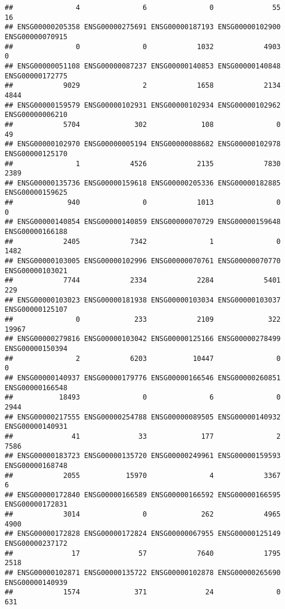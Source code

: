 \documentclass[
]{article}
\begin{document}
\begin{verbatim}
##               4               6               0              55              16 
## ENSG00000205358 ENSG00000275691 ENSG00000187193 ENSG00000102900 ENSG00000070915 
##               0               0            1032            4903               0 
## ENSG00000051108 ENSG00000087237 ENSG00000140853 ENSG00000140848 ENSG00000172775 
##            9029               2            1658            2134            4844 
## ENSG00000159579 ENSG00000102931 ENSG00000102934 ENSG00000102962 ENSG00000006210 
##            5704             302             108               0              49 
## ENSG00000102970 ENSG00000005194 ENSG00000088682 ENSG00000102978 ENSG00000125170 
##               1            4526            2135            7830            2389 
## ENSG00000135736 ENSG00000159618 ENSG00000205336 ENSG00000182885 ENSG00000159625 
##             940               0            1013               0               0 
## ENSG00000140854 ENSG00000140859 ENSG00000070729 ENSG00000159648 ENSG00000166188 
##            2405            7342               1               0            1482 
## ENSG00000103005 ENSG00000102996 ENSG00000070761 ENSG00000070770 ENSG00000103021 
##            7744            2334            2284            5401             229 
## ENSG00000103023 ENSG00000181938 ENSG00000103034 ENSG00000103037 ENSG00000125107 
##               0             233            2109             322           19967 
## ENSG00000279816 ENSG00000103042 ENSG00000125166 ENSG00000278499 ENSG00000150394 
##               2            6203           10447               0               0 
## ENSG00000140937 ENSG00000179776 ENSG00000166546 ENSG00000260851 ENSG00000166548 
##           18493               0               6               0            2944 
## ENSG00000217555 ENSG00000254788 ENSG00000089505 ENSG00000140932 ENSG00000140931 
##              41              33             177               2            7586 
## ENSG00000183723 ENSG00000135720 ENSG00000249961 ENSG00000159593 ENSG00000168748 
##            2055           15970               4            3367               6 
## ENSG00000172840 ENSG00000166589 ENSG00000166592 ENSG00000166595 ENSG00000172831 
##            3014               0             262            4965            4900 
## ENSG00000172828 ENSG00000172824 ENSG00000067955 ENSG00000125149 ENSG00000237172 
##              17              57            7640            1795            2518 
## ENSG00000102871 ENSG00000135722 ENSG00000102878 ENSG00000265690 ENSG00000140939 
##            1574             371              24               0             631 

\end{verbatim}
\end{document}
